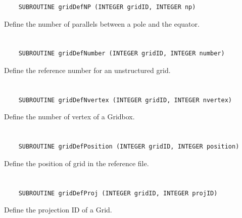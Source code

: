 \begin{verbatim}
    SUBROUTINE gridDefNP (INTEGER gridID, INTEGER np)
\end{verbatim}

Define the number of parallels between a pole and the equator.


\section*{\tt {}}

\begin{verbatim}
    SUBROUTINE gridDefNumber (INTEGER gridID, INTEGER number)
\end{verbatim}

Define the reference number for an unstructured grid.


\section*{\tt {}}

\begin{verbatim}
    SUBROUTINE gridDefNvertex (INTEGER gridID, INTEGER nvertex)
\end{verbatim}

Define the number of vertex of a Gridbox.


\section*{\tt {}}

\begin{verbatim}
    SUBROUTINE gridDefPosition (INTEGER gridID, INTEGER position)
\end{verbatim}

Define the position of grid in the reference file.


\section*{\tt {}}

\begin{verbatim}
    SUBROUTINE gridDefProj (INTEGER gridID, INTEGER projID)
\end{verbatim}

Define the projection ID of a Grid.


\section*{\tt {}}

